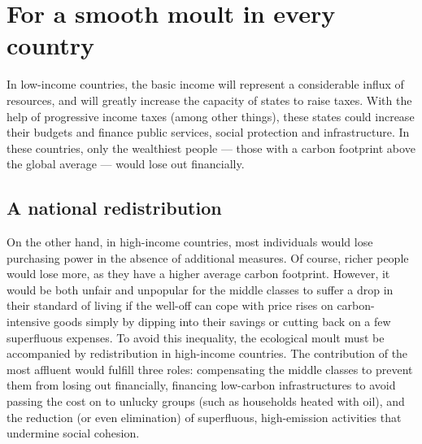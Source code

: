 \documentclass[a5paper,english,openany]{memoir}
\begin{document}
\section{For a smooth moult in every country}\label{sec:mue_nationale}

In low-income countries, the basic income will represent a considerable influx of resources, and will greatly increase the capacity of states to raise taxes. With the help of progressive income taxes (among other things), these states could increase their budgets and finance public services, social protection and infrastructure. In these countries, only the wealthiest people --- those with a carbon footprint above the global average --- would lose out financially. 

\subsection{A national redistribution} %
On the other hand, in high-income countries, most individuals would lose purchasing power in the absence of additional measures. Of course, richer people would lose more, as they have a higher average carbon footprint. However, it would be both unfair and unpopular for the middle classes to suffer a drop in their standard of living if the well-off can cope with price rises on carbon-intensive goods simply by dipping into their savings or cutting back on a few superfluous expenses. To avoid this inequality, the ecological moult must be accompanied by redistribution in high-income countries. The contribution of the most affluent would fulfill three roles: compensating the middle classes to prevent them from losing out financially, financing low-carbon infrastructures to avoid passing the cost on to unlucky groups (such as households heated with oil), %
and the reduction (or even elimination) of superfluous, high-emission activities that undermine social cohesion.
\end{document}
